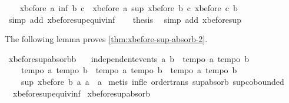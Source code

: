 \begin{isabellebody}
\ \ \isamarkupfalse%
\ {\isachardoublequoteopen}xbefore\ a\ {\isacharparenleft}inf\ b\ c{\isacharparenright}\ {\isacharequal}\ xbefore\ a\ {\isacharparenleft}sup\ {\isacharparenleft}xbefore\ b\ c{\isacharparenright}\ {\isacharparenleft}xbefore\ c\ b{\isacharparenright}{\isacharparenright}{\isachardoublequoteclose}\isanewline
\ \ \ \ \isamarkupfalse%
\ {\isacharparenleft}simp\ add{\isacharcolon}\ xbefore{\isacharunderscore}sup{\isacharunderscore}equiv{\isacharunderscore}inf{\isacharparenright}\isanewline
\ \ \isamarkupfalse%
\ {\isacharquery}thesis\ \isamarkupfalse%
\ {\isacharparenleft}simp\ add{\isacharcolon}\ xbefore{\isacharunderscore}sup{\isacharunderscore}{}{\isacharparenright}\isanewline
{}\isamarkupfalse%
%
\endisatagproof
{\isafoldproof}%
%
\isadelimproof
%
\endisadelimproof
%
\begin{isamarkuptext}%
The following lemma proves \cref{thm:xbefore-sup-absorb-2}.%
\end{isamarkuptext}\isamarkuptrue%
\isamarkupfalse%
\ xbefore{\isacharunderscore}sup{\isacharunderscore}absorb{\isacharunderscore}{}b{\isacharcolon}\ \isanewline
\ \ {\isachardoublequoteopen}independent{\isacharunderscore}events\ a\ b\ {\isasymLongrightarrow}\ {\isasymlbrakk}tempo{}\ a{\isacharsemicolon}\ tempo{}\ b{\isasymrbrakk}\ {\isasymLongrightarrow}\ \isanewline
\ \ \ \ {\isasymlbrakk}tempo{}\ a{\isacharsemicolon}\ tempo{}\ b{\isasymrbrakk}\ {\isasymLongrightarrow}\ {\isasymlbrakk}tempo{}\ a{\isacharsemicolon}\ tempo{}\ b{\isasymrbrakk}\ {\isasymLongrightarrow}\ {\isasymlbrakk}tempo{}\ a{\isacharsemicolon}\ tempo{}\ b{\isasymrbrakk}\ {\isasymLongrightarrow}\isanewline
\ \ \ \ sup\ {\isacharparenleft}xbefore\ b\ a{\isacharparenright}\ a\ {\isacharequal}\ a{\isachardoublequoteclose}\isanewline
%
\isadelimproof
%
\endisadelimproof
%
\isatagproof
{}\isamarkupfalse%
\ {\isacharparenleft}metis\ inf{\isacharunderscore}le{}\ order{\isacharunderscore}trans\ sup{\isachardot}absorb{}\ sup{\isachardot}cobounded{}\ \isanewline
\ \ xbefore{\isacharunderscore}sup{\isacharunderscore}equiv{\isacharunderscore}inf{\isacharparenright}%
\endisatagproof
{\isafoldproof}%
%
\isadelimproof
\isanewline
%
\endisadelimproof
\isanewline
{}\isamarkupfalse%
\ xbefore{\isacharunderscore}sup{\isacharunderscore}absorb{\isacharunderscore}{}{\isacharcolon}\ \isanewline

\end{isabellebody}
